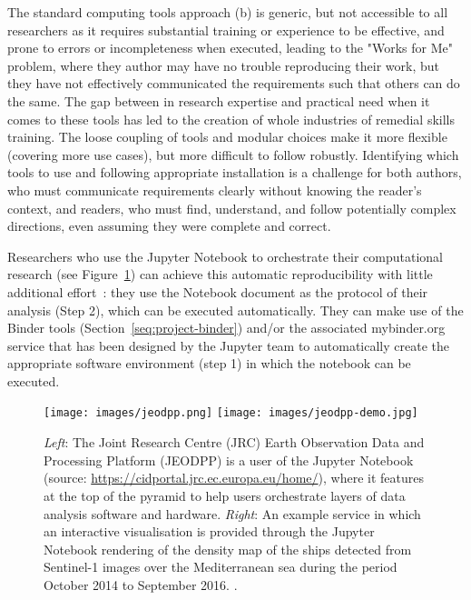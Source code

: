 The standard computing tools approach (b) is generic, but not accessible to all researchers
as it requires substantial training or experience to be effective,
and prone to errors or incompleteness when executed,
leading to the "Works for Me" problem,
where they author may have no trouble reproducing their work,
but they have not effectively communicated the requirements such that others can do the same.
The gap between in research expertise and practical need when it comes to these tools has led to the creation of whole industries of remedial skills training.
The loose coupling of tools and modular choices make it more flexible (covering more use cases),
but more difficult to follow robustly.
Identifying which tools to use and following appropriate installation is a challenge
for both authors, who must communicate requirements clearly without knowing the reader's context,
and readers, who must find, understand, and follow potentially complex directions, even assuming they were complete and correct.

\medskip Researchers who use the Jupyter Notebook to orchestrate their
computational research (see Figure~\ref{fig:jeodpp}) can achieve this automatic
reproducibility with little additional effort~\cite{Beg2021}: they use the Notebook document as
the protocol of their analysis (Step 2), which can be executed automatically.
They can make use of the Binder tools (Section~\ref{seq:project-binder}) and/or the
associated mybinder.org service that has
been designed by the Jupyter team to automatically create the appropriate
software environment (step 1) in which the notebook can be executed.

\begin{figure}[tb]
  \centering\texttt{[image: images/jeodpp.png]}
  \centering\texttt{[image: images/jeodpp-demo.jpg]}
  \caption{\emph{Left}: The Joint Research Centre (JRC) Earth Observation
    Data and Processing Platform (JEODPP) is a user of the
    Jupyter Notebook (source:
    \url{https://cidportal.jrc.ec.europa.eu/home/}), where it features
    at the top of the pyramid to help users orchestrate layers of data
    analysis software and hardware. \emph{Right}: An example
    service in which an interactive visualisation is provided through
    the Jupyter Notebook rendering of the density map of the ships
    detected from Sentinel-1 images over the Mediterranean sea during
    the period October 2014 to September 2016. \cite[Figure
    6]{Soille2018}. \label{fig:jeodpp}}
\end{figure}

